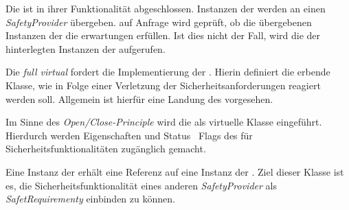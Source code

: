 Die  ist in ihrer Funktionalität abgeschlossen.
Instanzen der  werden an einen \textit{SafetyProvider} übergeben. auf Anfrage wird geprüft, ob die übergebenen Instanzen der  die erwartungen erfüllen. Ist dies nicht der Fall, wird die  der hinterlegten Instanzen der  aufgerufen.


Die \textit{full virtual}  fordert die Implementierung der . Hierin definiert die erbende Klasse, wie in Folge einer Verletzung der Sicherheitsanforderungen reagiert werden soll. Allgemein ist hierfür eine Landung des \Quad[s] vorgesehen.


Im Sinne des \textit{Open/Close-Principle} wird die  als virtuelle Klasse eingeführt. Hierdurch werden Eigenschaften und Status \bzw\ Flags des \Quad[s] für Sicherheitsfunktionalitäten zugänglich gemacht.


Eine Instanz der  erhält eine Referenz auf eine Instanz der . Ziel dieser Klasse ist es, die Sicherheitsfunktionalität eines anderen \textit{SafetyProvider} als \textit{SafetRequirementy} einbinden zu können.


